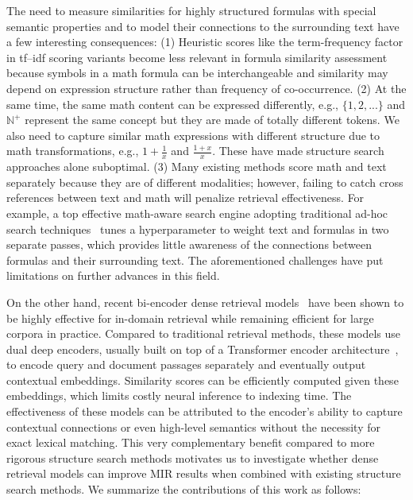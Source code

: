 \documentclass[11pt]{article}
\begin{document}
The need to measure similarities for highly structured formulas with special semantic properties and to model their connections to the surrounding text have a few interesting consequences:
(1) Heuristic scores like the term-frequency factor in tf--idf scoring variants become less relevant in formula similarity assessment because symbols in a math formula can be interchangeable and similarity may depend on expression structure rather than frequency of co-occurrence. 
(2) At the same time, the same math content can be expressed differently, e.g., $\{1,2,...\}$ and $\mathbb{N}^{+}$ represent the same concept but they are made of totally different tokens. 
We also need to capture similar math expressions with different structure due to math transformations, e.g., $1+\frac 1x$ and $\frac{1 + x}{x}$. 
These have made structure search approaches alone suboptimal.
(3) Many existing methods score math and text separately because they are of different modalities; however, failing to catch cross references between text and math will penalize retrieval effectiveness.
For example, a top effective math-aware search engine adopting traditional ad-hoc search techniques~\cite{fraser2018tangentL,ng2020dowsing, ng2021dowsing} tunes a hyperparameter to weight text and formulas in two separate passes, which provides little awareness of the connections between formulas and their surrounding text.
The aforementioned challenges have put limitations on further advances in this field.

On the other hand, recent bi-encoder dense retrieval models~\cite{karpukhin2020dpr,santhanam2021colbertv2,hofstatter2021TAS_B,formal2021spladeV2,gao2021condenser} have been shown to be highly effective for in-domain retrieval while remaining efficient for large corpora in practice.
Compared to traditional retrieval methods, these models use dual deep encoders, usually built on top of a Transformer encoder architecture~\cite{vaswani2017attention,devlin2019bert}, to encode query and document passages separately and eventually output contextual embeddings.
Similarity scores can be efficiently computed given these embeddings, which limits costly neural inference to indexing time.
The effectiveness of these models can be attributed to the encoder's ability to capture contextual connections or even high-level semantics without the necessity for exact lexical matching.
This very complementary benefit compared to more rigorous structure search methods motivates us to investigate whether dense retrieval models can improve MIR results when combined with existing structure search methods.
We summarize the contributions of this work as follows:
\end{document}

